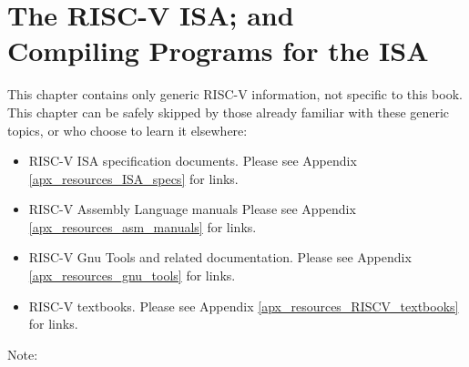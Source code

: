 

\chapter{The RISC-V ISA; and\\Compiling Programs for the ISA}



\setcounter{page}{1}
\renewcommand{\thepage}{\arabic{chapter}-\arabic{page}}

\label{ch_ISA}


This chapter contains only generic RISC-V information, not specific to
this book.  This chapter can be safely skipped by those already
familiar with these generic topics, or who choose to learn it
elsewhere:

\begin{itemize}

\item RISC-V ISA specification documents.
      Please see Appendix \ref{apx_resources_ISA_specs} for links.

\item RISC-V Assembly Language manuals
      Please see Appendix \ref{apx_resources_asm_manuals} for links.

\item RISC-V Gnu Tools and related documentation.
      Please see Appendix \ref{apx_resources_gnu_tools} for links.

\item RISC-V textbooks.
      Please see Appendix \ref{apx_resources_RISCV_textbooks} for links.

\end{itemize}

Note: 

